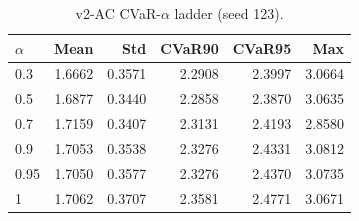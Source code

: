 \begin{table}[H]
    \centering
    \caption{v2-AC CVaR-$\alpha$ ladder (seed 123).}
    \label{tab:v2_ac_alpha}
    \begin{tabular}{@{}lrrrrr@{}}
        \toprule
        $\alpha$ & Mean & Std & CVaR90 & CVaR95 & Max \\
        \midrule
        0.3 & 1.6662 & 0.3571 & 2.2908 & 2.3997 & 3.0664 \\
        0.5 & 1.6877 & 0.3440 & 2.2858 & 2.3870 & 3.0635 \\
        0.7 & 1.7159 & 0.3407 & 2.3131 & 2.4193 & 2.8580 \\
        0.9 & 1.7053 & 0.3538 & 2.3276 & 2.4331 & 3.0812 \\
        0.95 & 1.7050 & 0.3577 & 2.3276 & 2.4370 & 3.0735 \\
        1 & 1.7062 & 0.3707 & 2.3581 & 2.4771 & 3.0671 \\
        \bottomrule
    \end{tabular}
\end{table}
